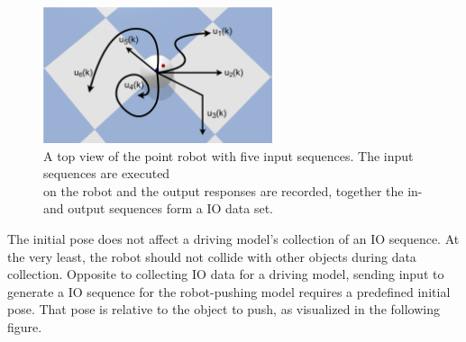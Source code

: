 \begin{figure}[H]
    \centering
    \includegraphics[width=0.6\textwidth]{figures/required_background/collect_io_robot}
    \caption{A top view of the point robot with five input sequences. The input sequences are executed\\on the robot and the output responses are recorded, together the in- and output sequences form a \ac{IO} data set.}%
    \label{fig:collect_io_robot}
\end{figure}

The initial pose does not affect a driving model's collection of an \ac{IO} sequence. At the very least, the robot should not collide with other objects during data collection. Opposite to collecting \ac{IO} data for a driving model, sending input to generate a \ac{IO} sequence for the robot-pushing model requires a predefined initial pose. That pose is relative to the object to push, as visualized in the following figure.\bs

